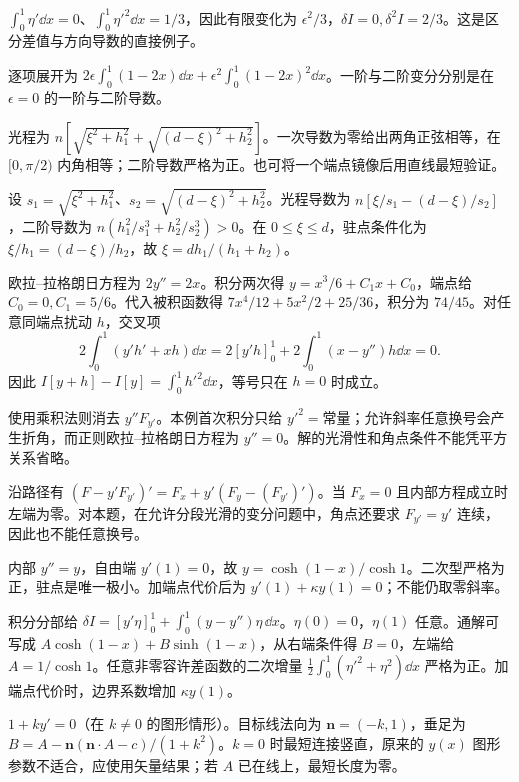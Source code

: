 \begin{bookexercises}
\item $\int_0^1\eta'\dd x=0$、$\int_0^1\eta'^2\dd x=1/3$，因此有限变化为 $\epsilon^2/3$，$\delta I=0,\delta^2I=2/3$。这是区分差值与方向导数的直接例子。

逐项展开为 $2\epsilon\int_0^1(1-2x)\dd x+\epsilon^2\int_0^1(1-2x)^2\dd x$。一阶与二阶变分分别是在 $\epsilon=0$ 的一阶与二阶导数。
\item 光程为 $n[\sqrt{\xi^2+h_1^2}+\sqrt{(d-\xi)^2+h_2^2}]$。一次导数为零给出两角正弦相等，在 $[0,\pi/2)$ 内角相等；二阶导数严格为正。也可将一个端点镜像后用直线最短验证。

设 $s_1=\sqrt{\xi^2+h_1^2}$、$s_2=\sqrt{(d-\xi)^2+h_2^2}$。光程导数为 $n[\xi/s_1-(d-\xi)/s_2]$，二阶导数为 $n(h_1^2/s_1^3+h_2^2/s_2^3)>0$。在 $0\le\xi\le d$，驻点条件化为 $\xi/h_1=(d-\xi)/h_2$，故 $\xi=dh_1/(h_1+h_2)$。
\item 欧拉--拉格朗日方程为 $2y''=2x$。积分两次得 $y=x^3/6+C_1x+C_0$，端点给 $C_0=0,C_1=5/6$。代入被积函数得 $7x^4/12+5x^2/2+25/36$，积分为 $74/45$。对任意同端点扰动 $h$，交叉项
\[
2\int_0^1(y'h'+xh)\dd x=2[y'h]_0^1+2\int_0^1(x-y'')h\dd x=0.
\]
因此 $I[y+h]-I[y]=\int_0^1h'^2\dd x$，等号只在 $h=0$ 时成立。
\item 使用乘积法则消去 $y''F_{y'}$。本例首次积分只给 $y'^2=\text{常量}$；允许斜率任意换号会产生折角，而正则欧拉--拉格朗日方程为 $y''=0$。解的光滑性和角点条件不能凭平方关系省略。

沿路径有 $(F-y'F_{y'})'=F_x+y'(F_y-(F_{y'})')$。当 $F_x=0$ 且内部方程成立时左端为零。对本题，在允许分段光滑的变分问题中，角点还要求 $F_{y'}=y'$ 连续，因此也不能任意换号。
\item 内部 $y''=y$，自由端 $y'(1)=0$，故 $y=\cosh(1-x)/\cosh1$。二次型严格为正，驻点是唯一极小。加端点代价后为 $y'(1)+\kappa y(1)=0$；不能仍取零斜率。

积分分部给 $\delta I=[y'\eta]_0^1+\int_0^1(y-y'')\eta\,\dd x$。$\eta(0)=0$，$\eta(1)$ 任意。通解可写成 $A\cosh(1-x)+B\sinh(1-x)$，从右端条件得 $B=0$，左端给 $A=1/\cosh1$。任意非零容许差函数的二次增量 $\frac12\int_0^1(\eta'^2+\eta^2)\dd x$ 严格为正。加端点代价时，边界系数增加 $\kappa y(1)$。
\item $1+ky'=0$（在 $k\ne0$ 的图形情形）。目标线法向为 $\boldsymbol n=(-k,1)$，垂足为 $B=A-\boldsymbol n(\boldsymbol n\cdot A-c)/(1+k^2)$。$k=0$ 时最短连接竖直，原来的 $y(x)$ 图形参数不适合，应使用矢量结果；若 $A$ 已在线上，最短长度为零。


\end{bookexercises}
